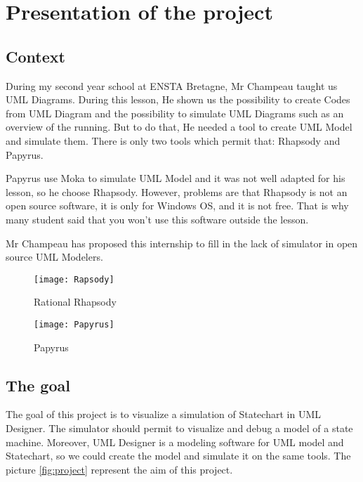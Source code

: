 
\chapter{Presentation of the project}

\section{Context}

During my second year school at ENSTA Bretagne, Mr Champeau taught us UML Diagrams. During this lesson, He shown us the possibility to create Codes from UML Diagram and the possibility to simulate UML Diagrams such as an overview of the running. But to do that, He needed a tool to create UML Model and simulate them. There is only two tools which permit that: Rhapsody and Papyrus.

Papyrus use Moka to simulate UML Model and it was not well adapted for his lesson, so he choose Rhapsody. However, problems are that Rhapsody is not an open source software, it is only for Windows OS, and it is not free. That is why many student said that you won't use this software outside the lesson.

Mr Champeau has proposed this internship to fill in the lack of simulator in open source UML Modelers.

  \begin{figure}[h]
    \begin{minipage}{0.45\linewidth}
      \centering
      \texttt{[image: Rapsody]}
      \caption{Rational Rhapsody}
      \label{fig:rhapsody}
    \end{minipage}\hfill
    \begin{minipage}{0.45\linewidth}
      \centering
      \texttt{[image: Papyrus]}
      \caption{Papyrus}
      \label{fig:papyrus}
    \end{minipage}
  \end{figure}



\section{The goal}

The goal of this project is to visualize a simulation of Statechart in UML Designer. The simulator should permit to visualize and debug a model of a state machine. Moreover, UML Designer is a modeling software for UML model and Statechart, so we could create the model and simulate it on the same tools. The picture \ref{fig:project} represent the aim of this project.

